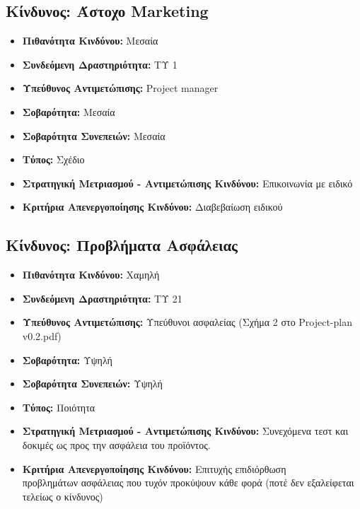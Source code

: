 \documentclass[12pt,a4paper]{article}
\begin{document}
\subsection{Κίνδυνος: Άστοχο Marketing}
\begin{itemize}
	\item \textbf{Πιθανότητα Κινδύνου:} Μεσαία
	\item \textbf{Συνδεόμενη Δραστηριότητα:} ΤΥ 1
	\item \textbf{Υπεύθυνος Αντιμετώπισης:} Project manager
	\item \textbf{Σοβαρότητα:} Μεσαία
	\item \textbf{Σοβαρότητα Συνεπειών:} Μεσαία
	\item \textbf{Τύπος:} Σχέδιο
	\item \textbf{Στρατηγική Μετριασμού - Αντιμετώπισης Κινδύνου:} Επικοινωνία με ειδικό
	\item \textbf{Κριτήρια Απενεργοποίησης Κινδύνου:} Διαβεβαίωση ειδικού
\end{itemize}

\subsection{Κίνδυνος: Προβλήματα Ασφάλειας}
\begin{itemize}
	\item \textbf{Πιθανότητα Κινδύνου:} Χαμηλή
	\item \textbf{Συνδεόμενη Δραστηριότητα:} ΤΥ 21
	\item \textbf{Υπεύθυνος Αντιμετώπισης:} Υπεύθυνοι ασφαλείας (Σχήμα 2 στο Project-plan v0.2.pdf)
	\item \textbf{Σοβαρότητα:} Υψηλή
	\item \textbf{Σοβαρότητα Συνεπειών:} Υψηλή
	\item \textbf{Τύπος:} Ποιότητα
	\item \textbf{Στρατηγική Μετριασμού - Αντιμετώπισης Κινδύνου:} Συνεχόμενα τεστ και δοκιμές ως προς την ασφάλεια του προϊόντος.
	\item \textbf{Κριτήρια Απενεργοποίησης Κινδύνου:} Επιτυχής επιδιόρθωση \\προβλημάτων ασφάλειας που τυχόν προκύψουν κάθε φορά (ποτέ δεν εξαλείφεται τελείως ο κίνδυνος)
\end{itemize}
\end{document}
